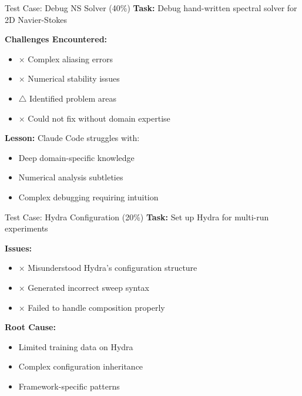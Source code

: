 \documentclass[aspectratio=169]{beamer}
\begin{document}
\begin{frame}{Test Case: Debug NS Solver (40\%)}
	\textbf{Task:} Debug hand-written spectral solver for 2D Navier-Stokes
	
	\textbf{Challenges Encountered:}
	\begin{itemize}
		\item {\color{red}$\times$} Complex aliasing errors
		\item {\color{red}$\times$} Numerical stability issues  
		\item {\color{orange}$\triangle$} Identified problem areas
		\item {\color{red}$\times$} Could not fix without domain expertise
	\end{itemize}
	
	\textbf{Lesson:} Claude Code struggles with:
	\begin{itemize}
		\item Deep domain-specific knowledge
		\item Numerical analysis subtleties
		\item Complex debugging requiring intuition
	\end{itemize}
\end{frame}

\begin{frame}{Test Case: Hydra Configuration (20\%)}
	\textbf{Task:} Set up Hydra for multi-run experiments
	
	\textbf{Issues:}
	\begin{itemize}
		\item {\color{red}$\times$} Misunderstood Hydra's configuration structure
		\item {\color{red}$\times$} Generated incorrect sweep syntax
		\item {\color{red}$\times$} Failed to handle composition properly
	\end{itemize}
	
	\textbf{Root Cause:}
	\begin{itemize}
		\item Limited training data on Hydra
		\item Complex configuration inheritance
		\item Framework-specific patterns
	\end{itemize}
\end{frame}
\end{document}
